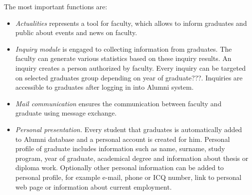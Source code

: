 \documentclass{iitsrc}[2006/14/02]
\begin{document}
The most important functions are:
\begin{itemize}

\item {\em Actualities} 
represents a tool for faculty, which allows to inform graduates and public about events and news on faculty.

\item {\em Inquiry module}
is engaged to collecting information from graduates. The faculty can generate various statistics based on these inquiry results. An inquiry creates a person authorized by faculty. Every inquiry can be targeted on selected graduates group depending on year of graduate???. Inquiries are accessible to graduates after logging in into Alumni system.

\item {\em Mail communication} ensures the communication between faculty and graduate using message exchange.

\item {\em Personal presentation.}
Every student that graduates is automatically added to Alumni database and a personal account is created for him. Personal profile of graduate includes information such as name, surname, study program, year of graduate, academical degree and information about thesis or diploma work. Optionally other personal information can be added to personal profile, for example e-mail, phone or ICQ number, link to personal web page or information about current employment. 


\end{itemize}
\end{document}

